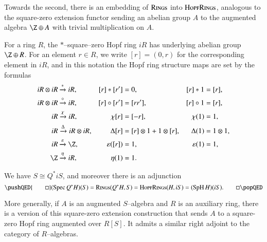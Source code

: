 Towards the second, there is an embedding of $\normalfont\textsc{Rings}$ into $\normalfont\textsc{HopfRings}$, analogous to the square-zero extension functor sending an abelian group $A$ to the augmented algebra $\Z \oplus A$ with trivial multiplication on $A$.

\begin{definition}
For a ring $R$, the $\ast$--square--zero Hopf ring $iR$ has underlying abelian group $\Z \oplus R$.  For an element $r \in R$, we write $[r] = (0, r)$ for the corresponding element in $iR$, and in this notation the Hopf ring structure maps are set by the formulas
\begin{align*}
iR \otimes iR & \xrightarrow{\ast} iR, & [r] \ast [r'] & = 0, & [r] \ast 1 & = [r], \\
iR \otimes iR & \xrightarrow{\circ} iR, & [r] \circ [r'] & = [rr'], & [r] \circ 1 & = [r], \\
iR & \xrightarrow{\chi} iR, & \chi[r] & = [-r], & \chi(1) & = 1, \\
iR & \xrightarrow{\Delta} iR \otimes iR, & \Delta [r] & = [r] \otimes 1 + 1 \otimes [r], & \Delta(1) & = 1 \otimes 1, \\
iR & \xrightarrow{\eps} \Z, & \eps([r]) & = 1, & \eps(1) & = 1, \\
\Z & \xrightarrow{\eta} iR, & \eta(1) & = 1.
\end{align*}
\end{definition}

\begin{lemma}\label{HopfRingsAndRingsAdjunction}
We have $S \cong Q^* i S$, and moreover there is an adjunction
\[\pushQED{\qed}
(\Spec Q^* H)(S) = \CatOf{Rings}(Q^* H, S) = \CatOf{HopfRings}(H, iS) = (\SpH H)(iS). \qedhere
\popQED\]
\end{lemma}

\begin{remark}
More generally, if $A$ is an augmented $S$--algebra and $R$ is an auxiliary ring, there is a version of this square-zero extension construction that sends $A$ to a square-zero Hopf ring augmented over $R[S]$.  It admits a similar right adjoint to the category of $R$--algebras.
\end{remark}

